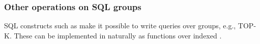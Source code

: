 \subsubsection{Other operations on SQL groups}

SQL constructs such as  make it possible to
write queries over groups, e.g., TOP-K.  These can be implemented in
\dbsp naturally as functions over indexed \zrs.

